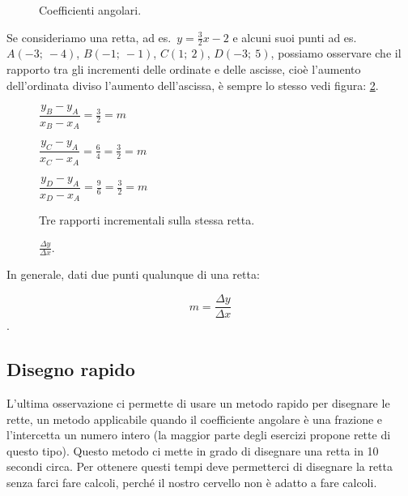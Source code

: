 \begin{inaccessibleblock}
 \begin{figure}[h]
 \centering
 \caption{Coefficienti angolari.}\label{fig:coeffang}
\end{figure}
\end{inaccessibleblock}

Se consideriamo una retta, ad es.~$y=\frac{3}{2}x -2$ e alcuni suoi punti
ad es.~$A(-3;~-4)$, $B(-1;~-1)$, $C(1;~2)$, $D(-3;~5)$, possiamo osservare che 
il rapporto tra gli incrementi delle ordinate e delle ascisse, 
cioè l'aumento dell'ordinata diviso l'aumento dell'ascissa, è sempre lo 
stesso vedi figura: \ref{fig:rappincr}.

\begin{inaccessibleblock}
 \begin{figure}[h]
 \centering
 \begin{minipage}[]{.50\textwidth}
$\dfrac{y_B - y_A}{x_B - x_A} = \frac{3}{2} = m$

$\dfrac{y_C - y_A}{x_C - x_A} = \frac{6}{4} = \frac{3}{2} = m$

$\dfrac{y_D - y_A}{x_D - x_A} = \frac{9}{6} = \frac{3}{2} = m$
  \caption{Tre rapporti incrementali sulla stessa retta.}\label{calc:rappincr}
 \end{minipage}
 \begin{minipage}[]{.40\textwidth}
   \centering
  \caption{$\frac{\Delta y}{\Delta x}$.}\label{fig:rappincr}
 \end{minipage}
\end{figure}
\end{inaccessibleblock}

In generale, dati due punti qualunque di una retta:

\[m = \frac{\Delta y}{\Delta x}\].

\subsection{Disegno rapido}

L'ultima osservazione ci permette di usare un metodo rapido per disegnare 
le rette, un metodo applicabile quando il coefficiente angolare è una 
frazione e l'intercetta un numero intero (la maggior parte degli esercizi 
propone rette di questo tipo). Questo metodo ci mette in grado di disegnare 
una retta in 10 secondi circa. Per ottenere questi tempi deve permetterci di 
disegnare la retta senza farci fare calcoli, perché il nostro cervello non è 
adatto a fare calcoli.

